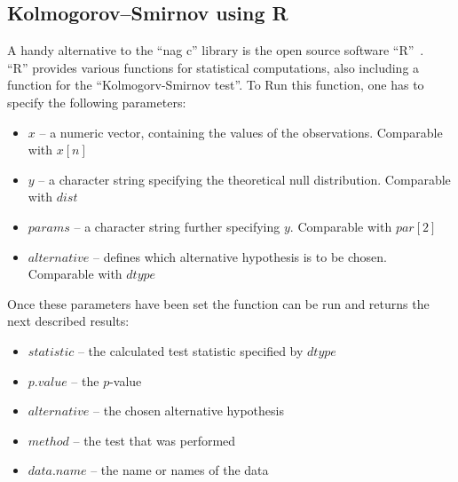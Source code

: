 \documentclass{article}
\begin{document}
\subsection{Kolmogorov–Smirnov using R}
A handy alternative to the ``nag c'' library is the open source software ``R''~\cite{rproject}.\\
``R'' provides various functions for statistical computations, also including a function for the ``Kolmogorv-Smirnov test''. To Run this function, one has to specify the following parameters:
\begin{itemize}
\item $x$ -- a numeric vector, containing the values of the observations. Comparable with $x[n]$
\item $y$ -- a character string specifying the theoretical null distribution. Comparable with $dist$
\item $params$ -- a character string further specifying $y$. Comparable with $par[2]$
\item $alternative$ -- defines which alternative hypothesis is to be chosen. Comparable with $dtype$
\end{itemize}
Once these parameters have been set the function can be run and returns the next described results:
\begin{itemize}
\item $statistic$ -- the calculated test statistic specified by $dtype$
\item $p.value$ -- the $p$-value
\item $alternative$ -- the chosen alternative hypothesis
\item $method$ -- the test that was performed
\item $data.name$ -- the name or names of the data
\end{itemize}
\end{document}
